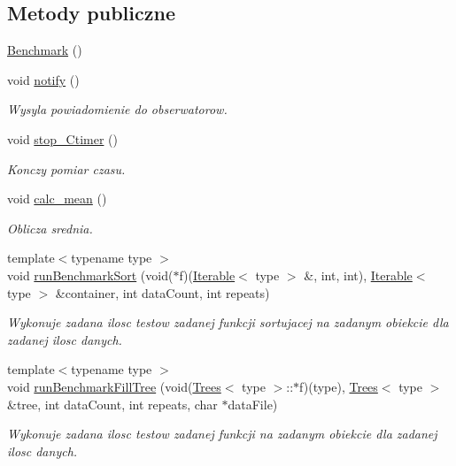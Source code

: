 \subsection*{Metody publiczne}
\begin{DoxyCompactItemize}
\item 
\hyperlink{class_benchmark_acfca497989836a688d44477802e822d8}{Benchmark} ()
\item 
void \hyperlink{class_benchmark_a408a44a1d64e45b647ef6dbba2f2c3d3}{notify} ()
\begin{DoxyCompactList}\small\item\em Wysyla powiadomienie do obserwatorow. \end{DoxyCompactList}\item 
void \hyperlink{class_benchmark_ab65889d4c2df3eb503048ab1cc6e7413}{stop\-\_\-\-Ctimer} ()
\begin{DoxyCompactList}\small\item\em Konczy pomiar czasu. \end{DoxyCompactList}\item 
void \hyperlink{class_benchmark_ac4d5360d2850510913efe07cf957f4c1}{calc\-\_\-mean} ()
\begin{DoxyCompactList}\small\item\em Oblicza srednia. \end{DoxyCompactList}\item 
{\footnotesize template$<$typename type $>$ }\\void \hyperlink{class_benchmark_ad5d8a563d9b9163758ae04d064cc38cb}{run\-Benchmark\-Sort} (void($\ast$f)(\hyperlink{class_iterable}{Iterable}$<$ type $>$ \&, int, int), \hyperlink{class_iterable}{Iterable}$<$ type $>$ \&container, int data\-Count, int repeats)
\begin{DoxyCompactList}\small\item\em Wykonuje zadana ilosc testow zadanej funkcji sortujacej na zadanym obiekcie dla zadanej ilosc danych. \end{DoxyCompactList}\item 
{\footnotesize template$<$typename type $>$ }\\void \hyperlink{class_benchmark_ac0795fc9eae36d523dde2fe06ea10fc0}{run\-Benchmark\-Fill\-Tree} (void(\hyperlink{class_trees}{Trees}$<$ type $>$\-::$\ast$f)(type), \hyperlink{class_trees}{Trees}$<$ type $>$ \&tree, int data\-Count, int repeats, char $\ast$data\-File)
\begin{DoxyCompactList}\small\item\em Wykonuje zadana ilosc testow zadanej funkcji na zadanym obiekcie dla zadanej ilosc danych. \end{DoxyCompactList}\item 

\end{DoxyCompactItemize}
